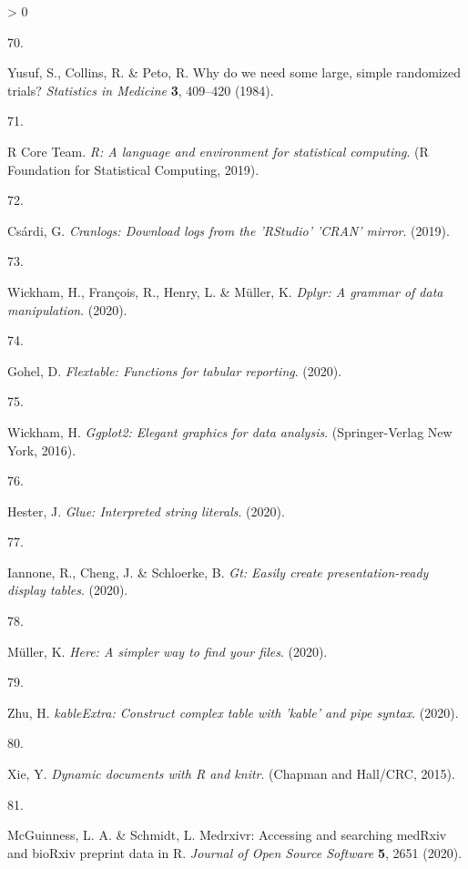 \documentclass[a4paper, twoside]{templates/ociamthesis}
\newlength{\cslhangindent}
\newlength{\csllabelwidth}
\newenvironment{CSLReferences}[3] %
 {%
  \setlength{\parindent}{0pt}
  \ifodd #1 \everypar{\setlength{\hangindent}{\cslhangindent}}\ignorespaces\fi
  \ifnum #2 > 0
  \setlength{\parskip}{#2\baselineskip}
  \fi
 }%
 {}
\newcommand{\CSLLeftMargin}[1]{\parbox[t]{\maxof{\widthof{#1}}{\csllabelwidth}}{#1}}
\newcommand{\CSLRightInline}[1]{\parbox[t]{\linewidth - \csllabelwidth}{#1}}
\begin{document}
\begin{CSLReferences}{0}{0}
\leavevmode\hypertarget{ref-yusuf1984}{}%
\CSLLeftMargin{70. }
\CSLRightInline{Yusuf, S., Collins, R. \& Peto, R. Why do we need some large, simple randomized trials? \emph{Statistics in Medicine} \textbf{3}, 409--420 (1984).}

\leavevmode\hypertarget{ref-base}{}%
\CSLLeftMargin{71. }
\CSLRightInline{R Core Team. \emph{R: {A} language and environment for statistical computing}. ({R Foundation for Statistical Computing}, 2019).}

\leavevmode\hypertarget{ref-cranlogs}{}%
\CSLLeftMargin{72. }
\CSLRightInline{Csárdi, G. \emph{Cranlogs: {Download} logs from the '{RStudio}' '{CRAN}' mirror}. (2019).}

\leavevmode\hypertarget{ref-dplyr}{}%
\CSLLeftMargin{73. }
\CSLRightInline{Wickham, H., François, R., Henry, L. \& Müller, K. \emph{Dplyr: {A} grammar of data manipulation}. (2020).}

\leavevmode\hypertarget{ref-flextable}{}%
\CSLLeftMargin{74. }
\CSLRightInline{Gohel, D. \emph{Flextable: {Functions} for tabular reporting}. (2020).}

\leavevmode\hypertarget{ref-ggplot2}{}%
\CSLLeftMargin{75. }
\CSLRightInline{Wickham, H. \emph{Ggplot2: {Elegant} graphics for data analysis}. ({Springer-Verlag New York}, 2016).}

\leavevmode\hypertarget{ref-glue}{}%
\CSLLeftMargin{76. }
\CSLRightInline{Hester, J. \emph{Glue: {Interpreted} string literals}. (2020).}

\leavevmode\hypertarget{ref-gt}{}%
\CSLLeftMargin{77. }
\CSLRightInline{Iannone, R., Cheng, J. \& Schloerke, B. \emph{Gt: {Easily} create presentation-ready display tables}. (2020).}

\leavevmode\hypertarget{ref-here}{}%
\CSLLeftMargin{78. }
\CSLRightInline{Müller, K. \emph{Here: {A} simpler way to find your files}. (2020).}

\leavevmode\hypertarget{ref-kableExtra}{}%
\CSLLeftMargin{79. }
\CSLRightInline{Zhu, H. \emph{{kableExtra}: {Construct} complex table with 'kable' and pipe syntax}. (2020).}

\leavevmode\hypertarget{ref-knitr}{}%
\CSLLeftMargin{80. }
\CSLRightInline{Xie, Y. \emph{Dynamic documents with {R} and knitr}. ({Chapman and Hall/CRC}, 2015).}

\leavevmode\hypertarget{ref-medrxivr}{}%
\CSLLeftMargin{81. }
\CSLRightInline{McGuinness, L. A. \& Schmidt, L. Medrxivr: {Accessing} and searching {medRxiv} and {bioRxiv} preprint data in {R}. \emph{Journal of Open Source Software} \textbf{5}, 2651 (2020).}


\end{CSLReferences}
\end{document}
